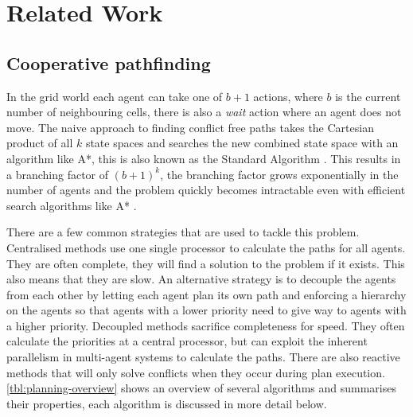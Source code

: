 \section{Related Work}\label{sec:related}

\subsection{Cooperative pathfinding}
In the grid world each agent can take one of $b+1$ actions, where $b$ is the
current number of neighbouring cells, there is also a \textit{wait} action
where an agent does not move. The naive approach to finding conflict free paths
takes the Cartesian product of all $k$ state spaces and searches the new
combined state space with an algorithm like A*, this is also known as the
Standard Algorithm \cite{standley2010}. This results in a branching factor of
$(b+1)^k$, the branching factor grows exponentially in the number of agents and
the problem quickly becomes intractable even with efficient search algorithms
like A* \cite{sharon2013}.

There are a few common strategies that are used to tackle this problem.
Centralised methods use one single processor to calculate the paths for all
agents. They are often complete, they will find a solution to the problem if it
exists. This also means that they are slow. An alternative strategy is to
decouple the agents from each other by letting each
agent plan its own path and enforcing a hierarchy on the agents so that agents
with a lower priority need to give way to agents with a higher priority.
Decoupled methods sacrifice completeness for speed. They often calculate the
priorities at a central processor, but can exploit the inherent parallelism in
multi-agent systems to calculate the paths. There are also reactive methods
that will only solve conflicts when they occur during plan execution.
\autoref{tbl:planning-overview} shows an overview of several algorithms and
summarises their properties, each algorithm is discussed in more detail below.

